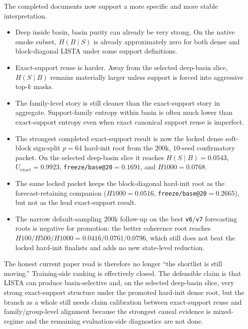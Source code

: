 \documentclass[11pt]{article}
\begin{document}
The completed documents now support a more specific and more stable
interpretation.

\begin{itemize}[leftmargin=1.5em]
    \item Deep inside basin, basin purity can already be very strong. On the
    native smoke subset, $H(B \mid S)$ is already approximately zero for both
    dense and block-diagonal LISTA under some support definitions.
    \item Exact-support reuse is harder. Away from the selected deep-basin
    slice, $H(S \mid B)$ remains materially larger unless support is forced
    into aggressive top-$k$ masks.
    \item The family-level story is still cleaner than the exact-support story
    in aggregate. Support-family entropy within basin is often much lower than
    exact-support entropy even when exact canonical support reuse is imperfect.
    \item The strongest completed exact-support result is now the locked dense
    soft-block sign-split $p=64$ hard-init root from the $200$k, $10$-seed
    confirmatory packet. On the selected deep-basin slice it reaches
    $H(S \mid B)=0.0543$, $U_{\text{exact}}=0.9923$,
    \texttt{freeze/base@20}$=0.1691$, and $H1000=0.0768$.
    \item The same locked packet keeps the block-diagonal hard-init root as
    the forecast-retaining companion ($H1000=0.0516$,
    \texttt{freeze/base@20}$=0.2665$), but not as the lead exact-support
    result.
    \item The narrow default-sampling $200$k follow-up on the best
    \texttt{v6}/\texttt{v7} forecasting roots is negative for promotion: the
    better coherence root reaches
    $H100/H500/H1000 = 0.0416 / 0.0761 / 0.0796$, which still does not beat
    the locked hard-init finalists and adds no new state-level reduction.
\end{itemize}

The honest current paper read is therefore no longer ``the shortlist is still
moving.'' Training-side ranking is effectively closed. The defensible claim is
that LISTA can produce basin-selective and, on the selected deep-basin slice,
very strong exact-support structure under the promoted hard-init dense root,
but the branch as a whole still needs claim calibration between exact-support
reuse and family/group-level alignment because the strongest causal evidence is
mixed-regime and the remaining evaluation-side diagnostics are not done.
\end{document}
